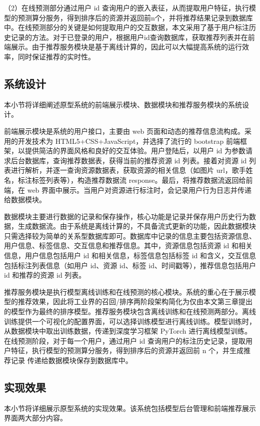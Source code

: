 （2）在线预测部分通过用户 id 查询用户的嵌入表征，从而提取用户特征，执行模型的预测算分服务，得到排序后的资源并返回前n个，并将推荐结果记录到数据库中。在线预测部分的关键是如何提取用户的交互数据，本文采用了基于用户标注历史记录的方法。对于已登录的用户，根据用户id查询数据库，获取推荐列表并在前端展示。由于推荐服务模块是基于离线计算的，因此可以大幅提高系统的运行效率，同时保证推荐的实时性。

\subsection{系统设计}
本小节将详细阐述原型系统的前端展示模块、数据模块和推荐服务模块的系统设计。

前端展示模块是系统的用户接口，主要由 web 页面和动态的推荐信息流构成。采用的开发技术为 HTML5+CSS+JavaScript，并选择了流行的 bootstrap 前端框架，以提供简洁的界面风格和良好的交互体验。用户登陆后，以用户 id 为参数请求后台数据库，查询推荐数据表，获得当前的推荐资源 id 列表。接着对资源 id 列表进行解析，并逐一查询资源数据表，获取资源的相关信息（如图片 url，歌手姓名，标注标签列表等），构造推荐数据流 response。最后，将推荐数据流返回给前端，在 web 界面中展示。当用户对资源进行标注时，会记录用户行为日志并传递给数据模块。

数据模块主要进行数据的记录和保存操作，核心功能是记录并保存用户历史行为数据，生成数据流。由于系统是离线计算的，不具备流式更新的功能，因此数据模块只需选择较为简单的关系型数据库即可。数据库中记录的信息主要包括资源信息、用户信息、标签信息、交互信息和推荐信息。其中，资源信息包括资源 id 和相关信息，用户信息包括用户 id 和相关信息，标签信息包括标签 id 和含义，交互信息包括标注列表信息（如用户 id、资源 id、标签 id、时间戳等），推荐信息包括用户 id 和推荐的资源 id 列表。

推荐服务模块是执行模型离线训练和在线预测的核心模块。系统的重心在于展示模型的推荐效果，因此将工业界的召回/排序两阶段架构简化为仅由本文第三章提出的模型作为最终的排序模型。推荐服务模块包含离线训练和在线预测两部分。离线训练提供一个可视化的配置界面，可以选择训练模型进行离线训练。模型训练时，从数据模块中取出训练数据，传递到深度学习框架 PyTorch 进行离线模型训练。在线预测阶段，对于每一个用户，通过用户 id 查询用户的标注历史记录，提取用户特征，执行模型的预测算分服务，得到排序后的资源并返回前 n 个，并生成推荐记录 传递给数据模块保存到数据库中。

\subsection{实现效果}
本小节将详细展示原型系统的实现效果。该系统包括模型后台管理和前端推荐展示界面两大部分内容。


